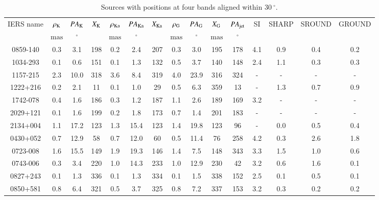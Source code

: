 \documentclass{aa-note}   %
\begin{document}
\begin{table}
    \centering
        \caption{\label{tab:aligned-sou}
        Sources with positions at four bands aligned within $30~^\circ$.
    }
    \begin{tabular}{ccccccccccccccc}
    \hline \noalign{\smallskip}
        IERS name & $\rho_{\rm K}$ & $PA_{\rm K}$ & $X_{\rm K}$ & $\rho_{\rm Ka}$ & $PA_{\rm Ka}$ & $X_{\rm Ka}$ & $\rho_{\rm G}$ & $PA_{\rm G}$ & $X_{\rm G}$ & $PA_{\rm jet}$ & SI & SHARP & SROUND & GROUND \\
        & $\mathrm{mas}$ & $\mathrm{{}^{\circ}}$ &  & $\mathrm{mas}$ & $\mathrm{{}^{\circ}}$ &  & $\mathrm{mas}$ & $\mathrm{{}^{\circ}}$ & $\mathrm{mas}$ & $\mathrm{{}^{\circ}}$ &  &  &  &  \\
        \hline \noalign{\smallskip}
        0859-140 & 0.3 & 3.1 & 198 & 0.2 & 2.4 & 207 & 0.3 & 3.0 & 195 & 178 & 4.1 & 0.9 & 0.4 & 0.2 \\
        1034-293 & 0.1 & 0.6 & 151 & 0.1 & 1.3 & 132 & 0.5 & 3.7 & 140 & 148 & 2.4 & 1.1 & 0.3 & 0.3 \\
        1157-215 & 2.3 & 10.0 & 318 & 3.6 & 8.4 & 319 & 4.0 & 23.9 & 316 & 324 & - & - & - & - \\
        1222+216 & 0.2 & 2.1 & 11 & 0.1 & 1.0 & 29 & 0.5 & 6.3 & 359 & 13 & - & 1.3 & 0.7 & 0.9 \\
        1742-078 & 0.4 & 1.6 & 186 & 0.3 & 1.2 & 187 & 1.1 & 2.6 & 189 & 169 & 3.2 & - & - & - \\
        2029+121 & 0.1 & 1.6 & 199 & 0.2 & 1.8 & 173 & 0.7 & 1.4 & 201 & 183 & - & - & - & - \\
        2134+004 & 1.1 & 17.2 & 123 & 1.3 & 15.4 & 123 & 1.4 & 19.8 & 123 & 96 & - & 0.0 & 0.5 & 0.4 \\
        \hline \noalign{\smallskip}
        0430+052 & 0.7 & 12.9 & 58 & 0.7 & 12.0 & 60 & 0.5 & 11.4 & 76 & 258 & 4.2 & 0.3 & 2.6 & 1.8 \\
        0723-008 & 1.6 & 15.5 & 149 & 1.9 & 19.3 & 146 & 1.4 & 7.5 & 148 & 343 & 3.3 & 1.5 & 1.0 & 0.6 \\
        0743-006 & 0.3 & 3.4 & 220 & 1.0 & 14.3 & 233 & 1.0 & 12.9 & 230 & 42 & 3.2 & 0.6 & 1.6 & 0.1 \\
        0827+243 & 0.1 & 1.3 & 336 & 0.1 & 1.3 & 334 & 0.1 & 1.5 & 338 & 152 & 2.5 & 0.1 & 0.5 & 0.1 \\
        0850+581 & 0.8 & 6.4 & 321 & 0.5 & 3.7 & 325 & 0.8 & 7.2 & 337 & 153 & 3.2 & 0.3 & 0.2 & 0.2 \\

\end{tabular}
\end{table}
\end{document}
